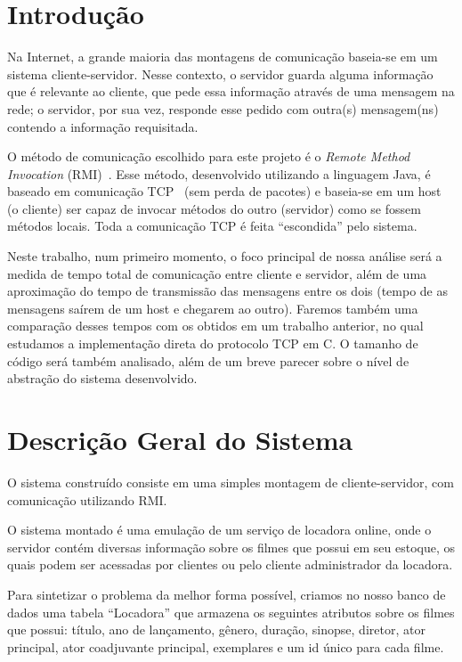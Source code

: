 \documentclass[12pt,a4paper]{article}
\begin{document}
\section{Introdução}
Na Internet, a grande maioria das montagens de comunicação baseia-se em um sistema cliente-servidor. Nesse contexto, o servidor guarda alguma informação que é relevante ao cliente, que pede essa informação através de uma mensagem na rede; o servidor, por sua vez, responde esse pedido com outra(s) mensagem(ns) contendo a informação requisitada.

O método de comunicação escolhido para este projeto é o {\it Remote Method Invocation} (RMI)~\cite{downing1998java, RMITutorial}. Esse método, desenvolvido utilizando a linguagem Java, é baseado em comunicação TCP~\cite{postel1981transmission} (sem perda de pacotes) e baseia-se em um host (o cliente) ser capaz de invocar métodos do outro (servidor) como se fossem métodos locais. Toda a comunicação TCP é feita ``escondida'' pelo sistema.

Neste trabalho, num primeiro momento, o foco principal de nossa análise será a medida de tempo total de comunicação entre cliente e servidor, além de uma aproximação do tempo de transmissão das mensagens entre os dois (tempo de as mensagens saírem de um host e chegarem ao outro). Faremos também uma comparação desses tempos com os obtidos em um trabalho anterior, no qual estudamos a implementação direta do protocolo TCP em C. O tamanho de código será também analisado, além de um breve parecer sobre o nível de abstração do sistema desenvolvido.

\section{Descrição Geral do Sistema}

O sistema construído consiste em uma simples montagem de cliente-servidor, com comunicação utilizando RMI. 

    O sistema montado é uma emulação de um serviço de locadora online, onde o servidor contém diversas informação sobre os filmes que possui em seu estoque, os quais podem ser acessadas por clientes ou pelo cliente administrador da locadora. 
    
    Para sintetizar o problema da melhor forma possível, criamos no nosso banco de dados uma tabela “Locadora” que armazena os seguintes atributos sobre os filmes que possui: título, ano de lançamento, gênero, duração, sinopse, diretor, ator principal, ator coadjuvante principal, exemplares e um id único para cada filme. 
    
\end{document}

